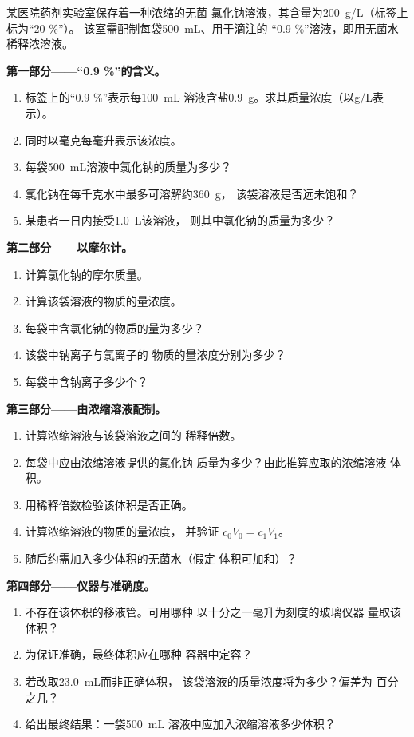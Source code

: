 \begin{problem}
\label{pb:g10:concentration-and-dilution:1}
某医院药剂实验室保存着一种浓缩的无菌
氯化钠溶液，其含量为\qty{200}{g/L}（标签上标为“20 \%”）。
该室需配制每袋\qty{500}{mL}、用于滴注的
“0.9 \%”溶液，即用无菌水稀释浓溶液。

\medskip
\noindent\textbf{第一部分——“0.9 \%”的含义。}
\begin{enumerate}
  \item 标签上的“0.9 \%”表示每\qty{100}{mL}
        溶液含盐\qty{0.9}{g}。求其质量浓度（以\si{g/L}表示）。
  \item 同时以毫克每毫升表示该浓度。
  \item 每袋\qty{500}{mL}溶液中氯化钠的质量为多少？
  \item 氯化钠在每千克水中最多可溶解约\qty{360}{g}，
        该袋溶液是否远未饱和？
  \item 某患者一日内接受\qty{1.0}{L}该溶液，
        则其中氯化钠的质量为多少？
\end{enumerate}

\medskip
\noindent\textbf{第二部分——以摩尔计。}
\begin{enumerate}[resume]
  \item 计算氯化钠的摩尔质量。
  \item 计算该袋溶液的物质的量浓度。
  \item 每袋中含氯化钠的物质的量为多少？
  \item 该袋中钠离子与氯离子的
        物质的量浓度分别为多少？
  \item 每袋中含钠离子多少个？
\end{enumerate}

\medskip
\noindent\textbf{第三部分——由浓缩溶液配制。}
\begin{enumerate}[resume]
  \item 计算浓缩溶液与该袋溶液之间的
        稀释倍数。
  \item 每袋中应由浓缩溶液提供的氯化钠
        质量为多少？由此推算应取的浓缩溶液
        体积。
  \item 用稀释倍数检验该体积是否正确。
  \item 计算浓缩溶液的物质的量浓度，
        并验证 $c_0 V_0 = c_1 V_1$。
  \item 随后约需加入多少体积的无菌水（假定
        体积可加和）？
\end{enumerate}

\medskip
\noindent\textbf{第四部分——仪器与准确度。}
\begin{enumerate}[resume]
  \item 不存在该体积的移液管。可用哪种
        以十分之一毫升为刻度的玻璃仪器
        量取该体积？
  \item 为保证准确，最终体积应在哪种
        容器中定容？
  \item 若改取\qty{23.0}{mL}而非正确体积，
        该袋溶液的质量浓度将为多少？偏差为
        百分之几？
  \item 给出最终结果：一袋\qty{500}{mL}
        溶液中应加入浓缩溶液多少体积？
\end{enumerate}
\end{problem}
